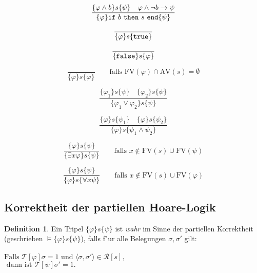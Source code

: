 \documentclass[german,10pt, a4paper, twocolumn]{scrartcl}
\theoremstyle{definition}
\newtheorem{definition}{Definition}[section]
\theoremstyle{remark}
\begin{document}
\begin{displaymath}
	\frac{\{ \varphi \land b \} s \{ \psi \} \quad \varphi \land \lnot b \rightarrow \psi}{\{\varphi\} \mbox{\tt if}\ b\ \mbox{\tt then}\ s\ \mbox{\tt end} \{ \psi\} }
\end{displaymath}

\begin{displaymath}
	\frac{}{\{\varphi\} s \{\mbox{\tt true}\}}
\end{displaymath}

\begin{displaymath}
	\frac{}{\{ \mbox{\tt false}\} s \{ \varphi\}}
\end{displaymath}

\begin{displaymath}
	\frac{}{\{ \varphi\} s \{ \varphi\}}\qquad \mbox{falls FV}(\varphi)\cap\mbox{AV}(s) = \emptyset
\end{displaymath}

\begin{displaymath}
	\frac{\{\varphi_1\} s \{ \psi\} \quad \{\varphi_2\} s \{\psi\} }{\{ \varphi_1 \lor \varphi_2 \} s \{ \psi\}}
\end{displaymath}

\begin{displaymath}
	\frac{\{\varphi\} s \{ \psi_1\} \quad \{\varphi\} s \{\psi_2\} }{\{ \varphi \} s \{ \psi_1 \land \psi_2\}}
\end{displaymath}

\begin{displaymath}
	\frac{\{\varphi\} s \{ \psi\}}{\{\exists x \varphi \} s \{ \psi\}} \qquad \mbox{falls } x \not \in \mbox{FV}(s) \cup \mbox{FV}(\psi)
\end{displaymath}

\begin{displaymath}
	\frac{\{\varphi\} s \{ \psi\}}{\{\varphi \} s \{\forall x \psi\}} \qquad \mbox{falls } x \not \in \mbox{FV}(s) \cup \mbox{FV}(\varphi)
\end{displaymath}

\subsection{Korrektheit der partiellen Hoare-Logik}

\begin{definition}
	Ein Tripel $\{\varphi \} s \{ \psi \}$ ist \textit{wahr} im Sinne der partiellen Korrektheit (geschrieben $\vDash \{\varphi\} s \{ \psi\}$), falls f"ur alle Belegungen $\sigma,\sigma'$ gilt:\\\\
		$\mbox{Falls } \mathcal{T}[\varphi]\sigma = 1 \mbox{ und } \langle \sigma, \sigma' \rangle \in \mathcal{R}[s],$\\
		$\mbox{ dann ist } \mathcal{T}[\psi]\sigma' = 1.$
\end{definition}
\end{document}
